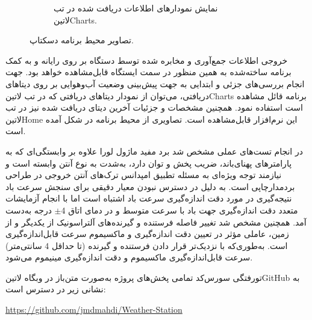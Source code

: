 \begin{figure}[!b]
\begin{subfigure}[b]{0.5\textwidth}
		\caption{نمایش نمودارهای اطلاعات دریافت شده در تب ‌لاتین{Charts}.}
		\label{fig:desktopAppCharts}
	\end{subfigure}
	\caption{تصاویر محیط برنامه دسکتاپ.}
	\label{fig:desktopApp}
\end{figure}

خروجی اطلاعات جمع‌آوری و مخابره شده توسط دستگاه بر روی رایانه و به کمک برنامه ساخته‌شده به همین منظور در سمت ایستگاه قابل‌مشاهده خواهد بود. جهت انجام بررسی‌های جزئی و ابتدایی به جهت پیش‌بینی وضعیت آب‌و‌هوایی بر روی دیتاهای دریافتی، می‌توان از نمودار دیتاهای دریافتی که در تب ‌لاتین{Charts} برنامه قائل مشاهده است استفاده نمود. همچنین مشخصات و جزئیات آخرین دیتای دریافت شده نیز در تب ‌لاتین{Home} این نرم‌افزار قابل‌مشاهده است. تصاویری از محیط برنامه در  شکل  آمده است.


در انجام تست‌های عملی مشخص شد برد مفید ماژول لورا علاوه بر وابستگی‌ای که به پارامترهای پهنای‌باند، ضریب پخش و توان دارد، به‌شدت به نوع آنتن وابسته است و نیازمند توجه ویژه‌ای به مسئله تطبیق امپدانس ترک‌های آنتن خروجی در طراحی بردمدارچاپی است. به دلیل در دسترس نبودن معیار دقیقی برای سنجش سرعت باد نتیجه‌گیری در مورد دقت اندازه‌گیری سرعت باد اشتباه است اما با انجام آزمایشات متعدد دقت اندازه‌گیری جهت باد با سرعت متوسط و در دمای اتاق 4$\pm$ درجه به‌دست آمد. همچنین مشخص شد تغییر فاصله فرستنده و گیرنده‌های آلتراسونیک از یکدیگر و از زمین، عاملی مؤثر در تعیین دقت اندازه‌گیری و ماکسیموم سرعت قابل‌اندازه‌گیری است. به‌طوری‌که با نزدیک‌تر قرار دادن فرستنده و گیرنده (تا حداقل 4 سانتی‌متر) سرعت قابل‌اندازه‌گیری ماکسیموم و دقت اندازه‌گیری مینیموم می‌شود.

\vspace{1cm}
‌تورفتگی
{ سورس‌کد تمامی پخش‌های پروژه به‌صورت متن‌باز در وبگاه ‌لاتین{GitHub} به نشانی زیر در دسترس است:}

\begin{latin}\noindent\large
	\href{https://github.com/jmdmahdi/Weather-Station}{https://github.com/jmdmahdi/Weather-Station}
\end{latin}

\vspace{0.5cm}
